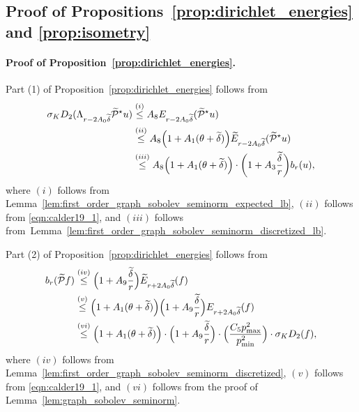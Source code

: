 \subsection{Proof of Propositions~\ref{prop:dirichlet_energies} and \ref{prop:isometry}}
\label{subsec:proof_of_prop_dirichlet_energies_and_isometry}

\paragraph{Proof of Proposition~\ref{prop:dirichlet_energies}.}
Part (1) of Proposition~\ref{prop:dirichlet_energies} follows from
\begin{align*}
\sigma_K D_2(\Lambda_{r - 2A_0\widetilde{\delta}} \widetilde{\mathcal{P}}^{\star}u) & \overset{(i)}{\leq} A_8 E_{r - 2A_0\widetilde{\delta}}(\widetilde{\mathcal{P}}^{\star}u) \\
& \overset{(ii)}{\leq} A_8 \Bigl(1 + A_1(\theta + \widetilde{\delta})\Bigr) \widetilde{E}_{r - 2A_0\widetilde{\delta}}(\widetilde{\mathcal{P}}^{\star}u) \\
& \overset{(iii)}{\leq} A_8 \Bigl(1 + A_1(\theta + \widetilde{\delta})\Bigr) \cdot \biggl(1 + A_3\frac{\widetilde{\delta}}{r}\biggr) b_r(u),
\end{align*}
where $(i)$ follows from Lemma~\ref{lem:first_order_graph_sobolev_seminorm_expected_lb}, $(ii)$ follows from \eqref{eqn:calder19_1}, and $(iii)$ follows from~Lemma~\ref{lem:first_order_graph_sobolev_seminorm_discretized_lb}.

Part (2) of Proposition~\ref{prop:dirichlet_energies} follows from
\begin{align*}
b_r(\widetilde{\mathcal{P}}f) & \overset{(iv)}{\leq} \Bigl(1 + A_9\frac{\widetilde{\delta}}{r}\Bigr)\widetilde{E}_{r + 2A_0\widetilde{\delta}}(f)\\
& \overset{(v)}{\leq} \Bigl(1 + A_1(\theta + \widetilde{\delta})\Bigr) \Bigl(1 + A_9\frac{\widetilde{\delta}}{r}\Bigr){E}_{r + 2A_0\widetilde{\delta}}(f) \\
& \overset{(vi)}{\leq} \Bigl(1 + A_1(\theta + \widetilde{\delta})\Bigr) \cdot \Bigl(1 + A_9\frac{\widetilde{\delta}}{r}\Bigr) \cdot \Bigl(\frac{C_5 p_{\max}^2}{p_{\min}^2}\Bigr) \cdot \sigma_{K} D_2(f),
\end{align*}
where $(iv)$ follows from Lemma~\ref{lem:first_order_graph_sobolev_seminorm_discretized}, $(v)$ follows from \eqref{eqn:calder19_1}, and $(vi)$ follows from the proof of Lemma~\ref{lem:graph_sobolev_seminorm}.

